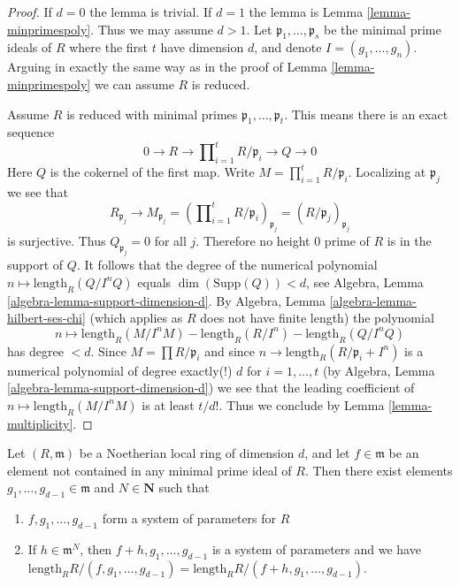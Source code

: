 \begin{proof}
If $d = 0$ the lemma is trivial. If $d = 1$ the lemma is
Lemma \ref{lemma-minprimespoly}. Thus we may assume $d > 1$.
Let $\mathfrak p_1, \ldots, \mathfrak p_s$ be the minimal prime ideals of
$R$ where the first $t$ have dimension $d$, and denote
$I = (g_1, \ldots, g_n)$. Arguing in exactly the same way as in
the proof of Lemma \ref{lemma-minprimespoly} we can assume $R$ is reduced.

\medskip\noindent
Assume $R$ is reduced with minimal primes
$\mathfrak p_1, \ldots, \mathfrak p_t$.
This means there is an exact sequence
$$
0 \to R \to
\prod\nolimits_{i = 1}^t R/\mathfrak p_i \to Q \to 0
$$
Here $Q$ is the cokernel of the first map.
Write $M = \prod_{i = 1}^t R/\mathfrak p_i$.
Localizing at $\mathfrak p_j$ we see that
$$
R_{\mathfrak p_j} \to M_{\mathfrak p_j} =
\left(\prod\nolimits_{i=1}^t R/\mathfrak p_i\right)_{\mathfrak p_j} =
(R/\mathfrak p_j)_{\mathfrak p_j}
$$
is surjective. Thus $Q_{\mathfrak p_j} = 0$ for all $j$. Therefore no
height $0$ prime of $R$ is in the support of $Q$. It follows that
the degree of the numerical polynomial
$n \mapsto \text{length}_R(Q/I^nQ)$ equals $\dim(\text{Supp}(Q))<d$, see
Algebra, Lemma \ref{algebra-lemma-support-dimension-d}.
By Algebra, Lemma \ref{algebra-lemma-hilbert-ses-chi}
(which applies as $R$ does not have finite length) the polynomial
$$
n \longmapsto
\text{length}_R(M/I^nM) - \text{length}_R(R/I^n) - \text{length}_R(Q/I^nQ)
$$
has degree $< d$. Since $M = \prod R/\mathfrak p_i$ and since
$n \to \text{length}_R(R/\mathfrak p_i + I^n)$ is a numerical
polynomial of degree exactly(!) $d$ for $i = 1, \ldots, t$ (by
Algebra, Lemma \ref{algebra-lemma-support-dimension-d})
we see that the leading coefficient of $n \mapsto \text{length}_R(M/I^nM)$
is at least $t/d!$. Thus we conclude by Lemma \ref{lemma-multiplicity}.
\end{proof}

\begin{lemma}
\label{lemma-sysparhigher}
Let $(R, \mathfrak m)$ be a Noetherian local ring of dimension $d$, and let
$f \in \mathfrak m$ be an element not contained in any minimal
prime ideal of $R$. Then there exist elements
$g_1, \ldots, g_{d - 1} \in \mathfrak m$ and $N \in \mathbf{N}$ such that
\begin{enumerate}
\item $f, g_1, \ldots, g_{d - 1}$ form a system of parameters for $R$
\item If $h \in \mathfrak m^N$, then $f + h, g_1, \ldots, g_{d - 1}$ is a
system of parameters and we have
$\text{length}_R R/(f, g_1, \ldots, g_{d-1}) =
\text{length}_R R/(f + h, g_1, \ldots, g_{d-1})$.
\end{enumerate}
\end{lemma}

